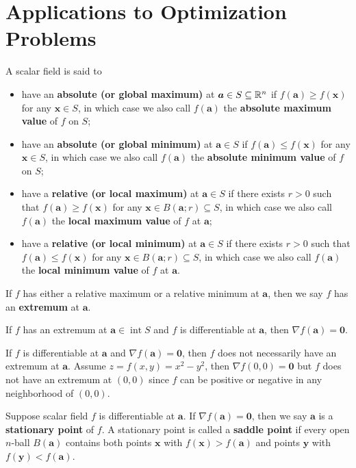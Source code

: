     \section{Applications to Optimization Problems}
    \begin{definitionenv}
        A scalar field is said to
        \begin{itemize}
            \item have an \textbf{absolute (or global maximum)} at $\bm a \in S \subseteq \mathbb{R}^n$ if $f(\bm a) \ge f(\bm x)$ for any $\bm x \in S$, in which case we also call $f(\bm a)$ the \textbf{absolute maximum value} of $f$ on $S$;
            \item have an \textbf{absolute (or global minimum)} at $\bm a \in S$ if $f(\bm a) \le f(\bm x)$ for any $\bm x \in S$, in which case we also call $f(\bm a)$ the \textbf{absolute minimum value} of $f$ on $S$;
            \item have a \textbf{relative (or local maximum)} at $\bm a \in S$ if there exists $r>0$ such that $f(\bm a) \ge f(\bm x)$ for any $\bm x \in B(\bm a; r)\subseteq S$, in which case we also call $f(\bm a)$ the \textbf{local maximum value} of $f$ at $\bm a$;
            \item have a \textbf{relative (or local minimum)} at $\bm a \in S$ if there exists $r>0$ such that $f(\bm a) \le f(\bm x)$ for any $\bm x \in B(\bm a; r)\subseteq S$, in which case we also call $f(\bm a)$ the \textbf{local minimum value} of $f$ at $\bm a$.
        \end{itemize}
        If $f$ has either a relative maximum or a relative minimum at $\bm a$, then we say $f$ has an \textbf{extremum} at $\bm a$.
    \end{definitionenv}
    \begin{theoremenv}
        If $f$ has an extremum at $\bm a\in \operatorname{int} S$ and $f$ is differentiable at $\bm a$, then $\nabla f(\bm a) = \bm 0$.
    \end{theoremenv}
    \begin{remarkenv}
        If $f$ is differentiable at $\bm a$ and $\nabla f(\bm a) = \bm 0$, then $f$ does not necessarily have an extremum at $\bm a$. Assume $z=f(x,y) = x^2 - y^2$, then $\nabla f(0,0) = \bm 0$ but $f$ does not have an extremum at $(0,0)$ since $f$ can be positive or negative in any neighborhood of $(0,0)$.
    \end{remarkenv}
    \begin{definitionenv}
        Suppose scalar field $f$ is differentiable at $\bm a$. If $\nabla f(\bm a) = \bm 0$, then we say $\bm a$ is a \textbf{stationary point} of $f$. A stationary point is called a \textbf{saddle point} if every open $n$-ball $B(\bm a)$ contains both points $\bm x$ with $f(\bm x) > f(\bm a)$ and points $\bm y$ with $f(\bm y) < f(\bm a)$.
    \end{definitionenv}
